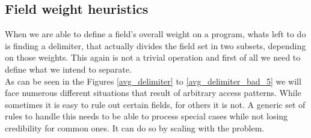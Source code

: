 \subsection{Field weight heuristics}\label{field_weight_heuristics}
When we are able to define a field's overall weight on a program, whats left to do is finding a delimiter, that actually divides the field set in two subsets, depending on those weights. This again is not a trivial operation and first of all we need to define what we intend to separate.\\
As can be seen in the Figures \ref{avg_delimiter} to \ref{avg_delimiter_bad_5} we will face numerous different situations that result of arbitrary access patterns. While sometimes it is easy to rule out certain fields, for others it is not. A generic set of rules to handle this needs to be able to process special cases while not losing credibility for common ones. It can do so by scaling with the problem.
